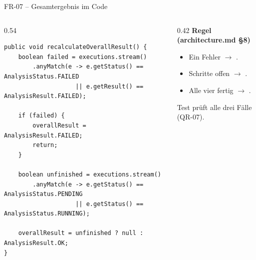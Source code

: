 \begin{frame}[fragile]{FR-07 -- Gesamtergebnis im Code}
  \begin{columns}[T,onlytextwidth]
    \begin{column}{0.54\textwidth}
      \begin{lstlisting}[style=java]
public void recalculateOverallResult() {
    boolean failed = executions.stream()
        .anyMatch(e -> e.getStatus() == AnalysisStatus.FAILED
                    || e.getResult() == AnalysisResult.FAILED);

    if (failed) {
        overallResult = AnalysisResult.FAILED;
        return;
    }

    boolean unfinished = executions.stream()
        .anyMatch(e -> e.getStatus() == AnalysisStatus.PENDING
                    || e.getStatus() == AnalysisStatus.RUNNING);

    overallResult = unfinished ? null : AnalysisResult.OK;
}
      \end{lstlisting}
    \end{column}
    \begin{column}{0.42\textwidth}
      \textbf{Regel (architecture.md \S8)}
      \begin{itemize}
        \item Ein Fehler $\rightarrow$ .
        \item Schritte offen $\rightarrow$ .
        \item Alle vier fertig $\rightarrow$ .
      \end{itemize}
      \vspace{0.2cm}
      \begin{block}{Test}
        \small {} prüft alle drei Fälle (QR-07).
      \end{block}
    \end{column}
  \end{columns}
\end{frame}

